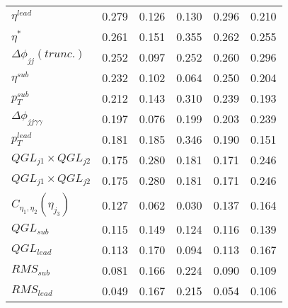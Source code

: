\documentclass[a4paper,portrait]{article}
\begin{document}
\begin{center}
\begin{tabular}{| l || c | c | c | c | c |}
$\eta^{lead}$ & 0.279 & 0.126 & 0.130 & 0.296 & 0.210 \\ 
$\eta^{*}$ & 0.261 & 0.151 & 0.355 & 0.262 & 0.255 \\ 
$\Delta\phi_{jj}(trunc.)$ & 0.252 & 0.097 & 0.252 & 0.260 & 0.296 \\ 
$\eta^{sub}$ & 0.232 & 0.102 & 0.064 & 0.250 & 0.204 \\ 
$p_{T}^{sub}$ & 0.212 & 0.143 & 0.310 & 0.239 & 0.193 \\ 
$\Delta\phi_{jj\gamma\gamma}$ & 0.197 & 0.076 & 0.199 & 0.203 & 0.239 \\ 
$p_{T}^{lead}$ & 0.181 & 0.185 & 0.346 & 0.190 & 0.151 \\ 
\rowcolor{Salmon}
$QGL_{j1}\times{QGL_{j2}}$ & 0.175 & 0.280 & 0.181 & 0.171 & 0.246 \\ 
\rowcolor{Salmon}
$QGL_{j1}\times{QGL_{j2}}$ & 0.175 & 0.280 & 0.181 & 0.171 & 0.246 \\ 
\rowcolor{Salmon}
$C_{\eta_{1},\eta_{2}}(\eta_{j_{3}})$ & 0.127 & 0.062 & 0.030 & 0.137 & 0.164 \\ 
$QGL_{sub}$ & 0.115 & 0.149 & 0.124 & 0.116 & 0.139 \\ 
$QGL_{lead}$ & 0.113 & 0.170 & 0.094 & 0.113 & 0.167 \\ 
$RMS_{sub}$ & 0.081 & 0.166 & 0.224 & 0.090 & 0.109 \\ 
$RMS_{lead}$ & 0.049 & 0.167 & 0.215 & 0.054 & 0.106 \\ 
\hline
\end{tabular}
\end{center}
\end{document}
